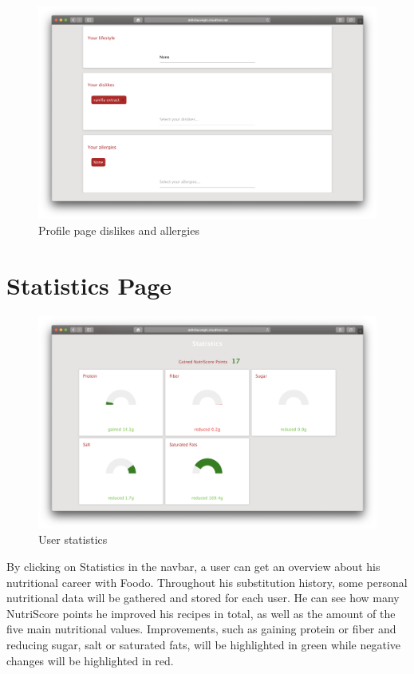 \begin{figure}[H]
	\captionsetup{justification=centering}
	\begin{center}
		\includegraphics[scale=0.25]{Ressourcen/img/screenshots/screenshotP.png}
		\vspace{-2em}
		\caption{Profile page dislikes and allergies}
	\end{center}
\end{figure}

\section*{Statistics Page}
\vspace{-2em}
\begin{figure}[H]
	\captionsetup{justification=centering}
	\begin{center}
		\includegraphics[scale=0.30]{Ressourcen/img/screenshots/screenshotQ.png}
		\vspace{-3em}
		\caption{User statistics}
	\end{center}
\end{figure}
By clicking on Statistics in the navbar, a user can get an overview about his nutritional career with Foodo. Throughout his substitution history, some personal nutritional data will be gathered and stored for each user. He can see how many NutriScore points he improved his recipes in total, as well as the amount of the five main nutritional values. Improvements, such as gaining protein or fiber and reducing sugar, salt or saturated fats, will be highlighted in green while negative changes will be highlighted in red.

